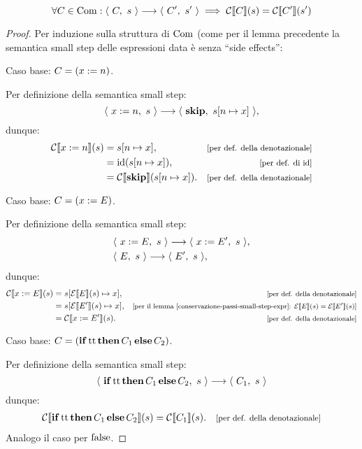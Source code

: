 \begin{proposizione}
\[
  \forall C \in \mathrm{Com} \mathrel{:} \langle\ C,\ s\ \rangle \longrightarrow \langle\ C',\ s'\ \rangle 
  \implies \mathcal{C}\llbracket C \rrbracket(s) = \mathcal{C}\llbracket C' \rrbracket(s')
\]
\begin{proof}
Per induzione sulla struttura di $\mathrm{Com}$ (come per il lemma precedente
la semantica small step delle espressioni data è senza ``side effects'':

Caso base: $C = (x := n)$.

Per definizione della semantica small step:
\[
  \langle\ x := n,\ s\ \rangle \longrightarrow \langle\ \mathop{\textup{\textbf{skip}}},\ s[n\mapsto x]\ \rangle,
\]
dunque:
\begin{align*}
  \calC\llbracket x \weq n \rrbracket(s)
  &= \assign{s}{n}{x},
    &\law{per def. della denotazionale} \\
  &= \id(\assign{s}{n}{x}),
    &\law{per def. di $\id$} \\ 
  &= \calC\llbracket \kw{skip} \rrbracket(\assign{s}{n}{x}).
     &\law{per def. della denotazionale} \\
\end{align*}

Caso base: $C = (x := E)$.

Per definizione della semantica small step:
\begin{align*}
  &\langle\ x := E,\ s\ \rangle \longrightarrow \langle\ x := E',\ s\ \rangle, \\
  &\langle\ E,\ s\ \rangle \longrightarrow \langle\ E',\ s\ \rangle,
\end{align*}
dunque:
\begin{align*}
  \calC\llbracket x \weq E \rrbracket(s)
  &= \assign{s}{\calE\llbracket E \rrbracket(s)}{x},
    &\law{per def. della denotazionale} \\
  &= \assign{s}{\calE\llbracket E' \rrbracket(s)}{x},
    &\law{per il lemma
      \ref{conservazione-passi-small-step-expr}: 
      $\calE\llbracket E \rrbracket(s) 
      = \calE\llbracket E' \rrbracket(s)$} \\
  &= \calC\llbracket x \weq E' \rrbracket(s).
    &\law{per def. della denotazionale}
\end{align*}

Caso base: $C = (\mathop{\textup{\textbf{if}}} \mathrm{tt} \mathop{\textup{\textbf{then}}} C_1 \mathop{\textup{\textbf{else}}} C_2)$.

Per definizione della semantica small step:
\[
  \langle\ \mathop{\textup{\textbf{if}}} \mathrm{tt} \mathop{\textup{\textbf{then}}} C_1 \mathop{\textup{\textbf{else}}} C_2,\ s\ \rangle \longrightarrow \langle\ C_1,\ s\ \rangle
\]
dunque:
\begin{align*}
  \calC\llbracket \kw{if} \ttv \kw{then} C_1 \kw{else} C_2 \rrbracket(s)
  &= \calC\llbracket C_1 \rrbracket(s).
    &\law{per def. della denotazionale} \\
\end{align*}
Analogo il caso per $\mathrm{false}$.


\end{proof}
\end{proposizione}
